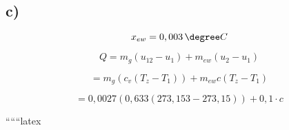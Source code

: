 

\subsection*{c)}

\[
x_{ew} = 0,003 \, \degree C
\]

\[
Q = m_g (u_{12} - u_1) + m_{ew} (u_2 - u_1)
\]

\[
= m_g (c_v (T_{z} - T_1)) + m_{ew} c (T_{z} - T_1)
\]

\[
= 0,0027 (0,633 (273,153 - 273,15)) + 0,1 \cdot c
\]

``````latex